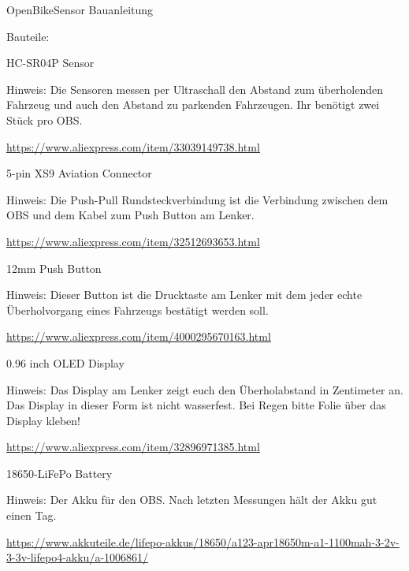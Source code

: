 \documentclass[
]{article}
\author{}
\date{}
\begin{document}
{OpenBikeSensor Bauanleitung}

{}

{Bauteile:}

{HC-SR04P Sensor }

{Hinweis: Die Sensoren messen per Ultraschall den Abstand zum
überholenden Fahrzeug und auch den Abstand zu parkenden Fahrzeugen. Ihr
benötigt zwei Stück pro OBS.}

{\href{https://www.google.com/url?q=https://www.aliexpress.com/item/33039149738.html\&sa=D\&ust=1588976963766000}{https://www.aliexpress.com/item/33039149738.html}}

{}

{5-pin XS9 Aviation Connector }

{Hinweis: Die Push-Pull Rundsteckverbindung ist die Verbindung zwischen
dem OBS und dem Kabel zum Push Button am Lenker. }

{\href{https://www.google.com/url?q=https://www.aliexpress.com/item/32512693653.html\&sa=D\&ust=1588976963767000}{https://www.aliexpress.com/item/32512693653.html}}

{}

{12mm Push Button}

{Hinweis: Dieser Button ist die Drucktaste am Lenker mit dem jeder echte
Überholvorgang eines Fahrzeugs bestätigt werden soll.}

{\href{https://www.google.com/url?q=https://www.aliexpress.com/item/4000295670163.html\&sa=D\&ust=1588976963768000}{https://www.aliexpress.com/item/4000295670163.html}}

{}

{0.96 inch OLED Display}

{Hinweis: Das Display am Lenker zeigt euch den Überholabstand in
Zentimeter an. Das Display in dieser Form ist nicht wasserfest. Bei
Regen bitte Folie über das Display kleben!}

{\href{https://www.google.com/url?q=https://www.aliexpress.com/item/32896971385.html\&sa=D\&ust=1588976963769000}{https://www.aliexpress.com/item/32896971385.html}}

{}

{18650-LiFePo Battery}

{Hinweis: Der Akku für den OBS. Nach letzten Messungen hält der Akku gut
einen Tag. }

{\href{https://www.google.com/url?q=https://www.akkuteile.de/lifepo-akkus/18650/a123-apr18650m-a1-1100mah-3-2v-3-3v-lifepo4-akku/a-1006861/\&sa=D\&ust=1588976963770000}{https://www.akkuteile.de/lifepo-akkus/18650/a123-apr18650m-a1-1100mah-3-2v-3-3v-lifepo4-akku/a-1006861/}}
\end{document}
